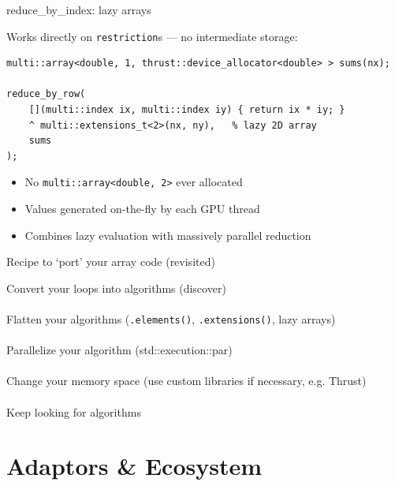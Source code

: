 \begin{frame}[fragile]{reduce\_by\_index: lazy arrays}

Works directly on \lstinline|restriction|s --- no intermediate storage:
\begin{lstlisting}
multi::array<double, 1, thrust::device_allocator<double> > sums(nx);

reduce_by_row(
    [](multi::index ix, multi::index iy) { return ix * iy; }
    ^ multi::extensions_t<2>(nx, ny),   % lazy 2D array
    sums
);
\end{lstlisting}

\begin{itemize}
  \item No \lstinline|multi::array<double, 2>| ever allocated
  \item Values generated on-the-fly by each GPU thread
  \item Combines lazy evaluation with massively parallel reduction
\end{itemize}
\end{frame}

\begin{frame}{Recipe to `port' your array code (revisited)}
\begin{center}
  Convert your loops into algorithms (discover)\\
        \\
      Flatten your algorithms (\lstinline|.elements()|, \lstinline|.extensions()|, lazy arrays)\\
        \\
      Parallelize your algorithm (std::execution::par)\\
          \\
      Change your memory space (use custom libraries if necessary, e.g. Thrust)\\
          \\
      Keep looking for algorithms
  \end{center}
\end{frame}

\section{Adaptors \& Ecosystem}

